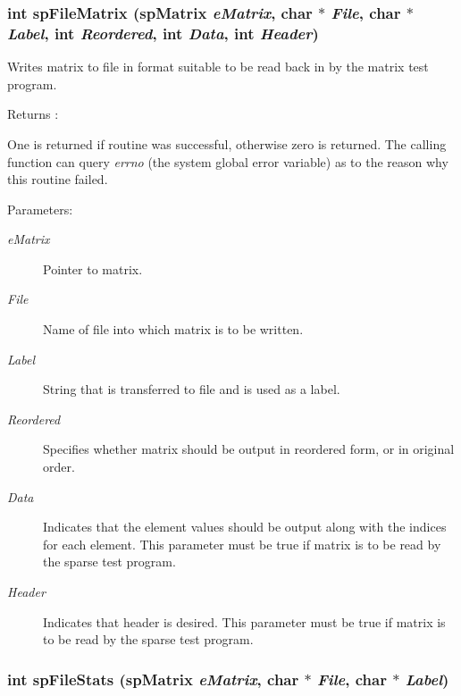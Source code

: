\subsubsection{\setlength{\rightskip}{0pt plus 5cm}int sp\-File\-Matrix ({\bf sp\-Matrix} {\em e\-Matrix}, char $\ast$ {\em File}, char $\ast$ {\em Label}, int {\em Reordered}, int {\em Data}, int {\em Header})}\label{spOutput_8c_a4}


Writes matrix to file in format suitable to be read back in by the matrix test program.

\begin{Desc}
\item[Returns :]\par
 One is returned if routine was successful, otherwise zero is returned. The calling function can query {\em errno} (the system global error variable) as to the reason why this routine failed.\end{Desc}
\begin{Desc}
\item[Parameters: ]\par
\begin{description}
\item[{\em 
e\-Matrix}]Pointer to matrix. \item[{\em 
File}]Name of file into which matrix is to be written. \item[{\em 
Label}]String that is transferred to file and is used as a label. \item[{\em 
Reordered}]Specifies whether matrix should be output in reordered form, or in original order. \item[{\em 
Data}]Indicates that the element values should be output along with the indices for each element. This parameter must be true if matrix is to be read by the sparse test program. \item[{\em 
Header}]Indicates that header is desired. This parameter must be true if matrix is to be read by the sparse test program. \end{description}
\end{Desc}
\subsubsection{\setlength{\rightskip}{0pt plus 5cm}int sp\-File\-Stats ({\bf sp\-Matrix} {\em e\-Matrix}, char $\ast$ {\em File}, char $\ast$ {\em Label})}\label{spOutput_8c_a6}


